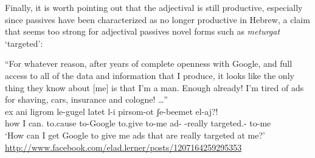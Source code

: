 \begin{exe}
\begin{xlist}
\begin{exe}
\begin{xlist}
\begin{exe}
\begin{exe}
\begin{xlist}
\begin{exe}
\begin{exe}
\begin{xlist}
\begin{exe}
\begin{xlist}
\begin{exe}
\begin{xlist}
\begin{exe}
\begin{xlist}
\begin{exe}
\begin{xlist}
\begin{xlist}
\begin{exe}
\begin{xlist}
\begin{exe}
\begin{xlist}
\begin{exe}
\begin{exe}
\begin{exe}
\begin{xlist}
\begin{exe}
\begin{exe}
\begin{xlist}
\begin{exe}
\begin{xlist}
\begin{exe}
\begin{xlist}
\begin{exe}
\begin{xlist}
\begin{xlist}
\begin{exe}
\begin{xlist}
\begin{exe}
\begin{xlist}
\begin{exe}
\begin{xlist}
\begin{exe}
\begin{xlist}
\begin{exe}
\begin{exe}
\begin{exe}
\begin{exe}
\begin{exe}
\begin{xlist}
\begin{xlist}
\begin{exe}
\begin{xlist}
\begin{exe}
\begin{xlist}
\begin{exe}
\begin{exe}
\begin{exe}
\begin{xlist}
\begin{exe}
\begin{xlist}
\begin{exe}
\begin{xlist}
Finally, it is worth pointing out that the adjectival  is still productive, especially since passives have been characterized as no longer productive in Hebrew, a claim that seems too strong for adjectival passives novel forms such as \emph{meturgat} `targeted':
 \begin{exe}
\ex  ``For whatever reason, after years of complete openness with Google, and full access to all of the data and information that I produce, it looks like the only thing they know about [me] is that I'm a man. Enough already! I'm tired of ads for shaving, cars, insurance and cologne! \dots '' \\
	 \gll ex ani  ligrom le-gugel latet l-i pirsom-ot ʃe-beemet  el-aj?!\\
 		  how I can. to.cause to-Google to.give to-me ad- -really targeted.- to-me\\
 		\glt `How can I get Google to give me ads that are really targeted at me?' \hfill \url{http://www.facebook.com/elad.lerner/posts/1207164259295353} 
 \z 



\end{exe}
\end{xlist}
\end{exe}
\end{xlist}
\end{exe}
\end{xlist}
\end{exe}
\end{exe}
\end{exe}
\end{xlist}
\end{exe}
\end{xlist}
\end{exe}
\end{xlist}
\end{xlist}
\end{exe}
\end{exe}
\end{exe}
\end{exe}
\end{exe}
\end{xlist}
\end{exe}
\end{xlist}
\end{exe}
\end{xlist}
\end{exe}
\end{xlist}
\end{exe}
\end{xlist}
\end{xlist}
\end{exe}
\end{xlist}
\end{exe}
\end{xlist}
\end{exe}
\end{xlist}
\end{exe}
\end{exe}
\end{xlist}
\end{exe}
\end{exe}
\end{exe}
\end{xlist}
\end{exe}
\end{xlist}
\end{exe}
\end{xlist}
\end{xlist}
\end{exe}
\end{xlist}
\end{exe}
\end{xlist}
\end{exe}
\end{xlist}
\end{exe}
\end{xlist}
\end{exe}
\end{exe}
\end{xlist}
\end{exe}
\end{exe}
\end{xlist}
\end{exe}
\end{xlist}
\end{exe}
